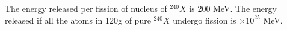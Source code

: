 \item The energy released per fission of nucleus of $^{240}X$ is 200 MeV. The energy released if all the atoms in 120g of pure $^{240}X$ undergo fission is \underline{\hspace{2.5cm}} $\times 10^{25}$ MeV.

    \begin{center}
    \end{center}